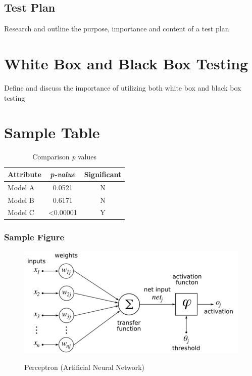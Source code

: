 \documentclass[12pt]{article}
\begin{document}
\subsection{Test Plan}
Research and outline the purpose, importance and content of a test plan



\section{White Box and Black Box Testing} \label{blackwhitebox}
Define and discuss the importance of utilizing both white box and black box testing



\pagebreak
\section{Sample Table}
\begin{table}[ht!]
\centering
    
	\caption{Comparison \textit{p} values}
	\begin{tabular}{ |l|c|c|}	
		\hline		
		\textbf{Attribute} & \textbf{\textit{p-value}} & \textbf{Significant} \\ \hline
		Model A	 & 0.0521 & N \\ \hline
		Model B  & 0.6171 & N \\ \hline 
		Model C  & <0.00001 & Y \\ \hline 
	\end{tabular}
	\label{tab:pvalues}
\end{table} 


\subsubsection{Sample Figure}
\begin{figure}[ht!]
 	\centering
 	\caption{Perceptron (Artificial Neural Network)}
 	\includegraphics[width=0.7\linewidth]{images/ANN.jpg}
 	\label{lab:perceptron}
 \end{figure}
\pagebreak





\renewcommand{\bibname}{References} %
\end{document}
